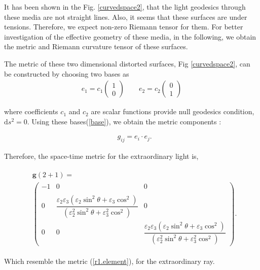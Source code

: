 \documentclass[9pt,twocolumn,twoside]{osajnl}
\begin{document}
It has been shown in the Fig. \ref{curvedspace2},  that the light geodesics through these media
 are not straight lines. Also, it seems that these surfaces are under tensions.  Therefore,  we expect non-zero Riemann tensor for them. For better investigation of the effective geometry of these media, in the following,  we obtain the metric and Riemann curvature tensor of these surfaces. 
 
The metric of  these two dimensional distorted surfaces, Fig \ref{curvedspace2}, can be constructed by choosing two bases as 
\begin{eqnarray}\label{base}
e_{1}=c_{1}
\begin{pmatrix}
1\\0
\end{pmatrix} \qquad
e_{2}=c_{2}
\begin{pmatrix}
0\\1
\end{pmatrix}
\end{eqnarray}

 where coefficients $c_{1}$ and $c_{2}$  are scalar functions provide null geodesics condition, $\mathrm{d}s^{2}=0$. Using these bases(\ref{base}), we obtain the metric components \cite{leonhardt2012geometry}:
 
\begin{eqnarray}
&g_{ij}=e_{i}\cdot e_{j}.
\end{eqnarray}

Therefore, the space-time metric for the extraordinary light is,  

\begin{align}\label{m2}
\begin{split}
&\mathbf{g}(2+1) =\\
&\begin{pmatrix}
-1&0&0\\
\\ 0& \dfrac{\varepsilon_{2}\varepsilon_{3}\left({\varepsilon_{2} \sin^{2}{\theta} + \varepsilon_{3}\cos^{2}}\right)}{\left({\varepsilon_{2}^{2} \sin^{2}{\theta} + \varepsilon_{3}^{2}\cos^{2}}\right)}&0\\
0&0&\dfrac{\varepsilon_{2}\varepsilon_{3}\left({\varepsilon_{2} \sin^{2}{\theta} + \varepsilon_{3}\cos^{2}}\right)}{\left({\varepsilon_{2}^{2} \sin^{2}{\theta} + \varepsilon_{3}^{2}\cos^{2}}\right)}
\end{pmatrix}.
\end{split}
\end{align}

Which resemble  the metric (\ref{r1.element}), for the extraordinary ray.
 
\end{document}
